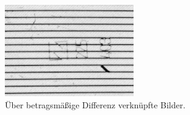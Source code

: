 \begin{figure}[H]
	\centering
	\includegraphics[width=0.5\textwidth]{03_sichtpruefungDurchLichtstreuung/einsatzVonMehrerenStreifenmustern/figures/diffImage}
	\caption[Verknüpfte Bilder über Differenz]{Über betragsmäßige Differenz verknüpfte Bilder.}
	\label{img:diffImage}
\end{figure}